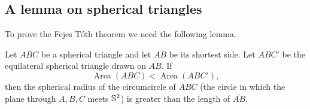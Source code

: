 \subsection{A lemma on spherical triangles}

To prove the Fejes T\'oth theorem we need the following lemma.

\begin{lemma}\label{L2:lem:triangle}
Let $ABC$ be a spherical triangle and let $\overline{AB}$ be its shortest side. Let $ABC'$ be the
equilateral spherical triangle drawn on $\overline{AB}$. If
\[
\operatorname{Area}(ABC) < \operatorname{Area}(ABC'),
\]
then the spherical radius of the circumcircle of $ABC$ (the circle in which the plane through $A,B,C$
meets $\mathbb{S}^2$) is greater than the length of $\overline{AB}$.
\end{lemma}

